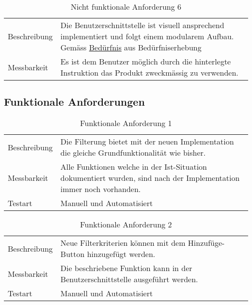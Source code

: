 \begin{table}[h!]
   \begin{tabular}{|L{0.3\textwidth}|L{0.6\textwidth}|}
       \hline
         \\[4pt]
       \hline
       Beschreibung & Die Benutzerschnittstelle ist visuell ansprechend implementiert und folgt einem modularem Aufbau. Gemäss \hyperref[bed1]{Bedürfnis} aus Bedürfniserhebung \\
       \hline
       Messbarkeit & Es ist dem Benutzer möglich durch die hinterlegte Instruktion das Produkt zweckmässig zu verwenden.  \\
       \hline
     \end{tabular}
     \caption{Nicht funktionale Anforderung 6}
\end{table}

\newpage

\subsection{Funktionale Anforderungen}
\begin{table}[h!]
   \begin{tabular}{|L{0.3\textwidth}|L{0.6\textwidth}|}
       \hline
         \\[4pt]
       \hline
       Beschreibung & Die Filterung bietet mit der neuen Implementation die gleiche Grundfunktionalität wie bisher. \\
       \hline
       Messbarkeit & Alle Funktionen welche in der Ist-Situation dokumentiert wurden, sind nach der Implementation immer noch vorhanden. \\
       \hline
       Testart & Manuell und Automatisiert \\
       \hline
     \end{tabular}
     \caption{Funktionale Anforderung 1}
\end{table}

\begin{table}[h!]
   \begin{tabular}{|L{0.3\textwidth}|L{0.6\textwidth}|}
       \hline
         \\[4pt]
       \hline
       Beschreibung & Neue Filterkriterien können mit dem Hinzufüge-Button hinzugefügt werden. \\
       \hline
       Messbarkeit & Die beschriebene Funktion kann in der Benutzerschnittstelle ausgeführt werden. \\
       \hline
       Testart & Manuell und Automatisiert \\
       \hline
     \end{tabular}
     \caption{Funktionale Anforderung 2}
\end{table}

